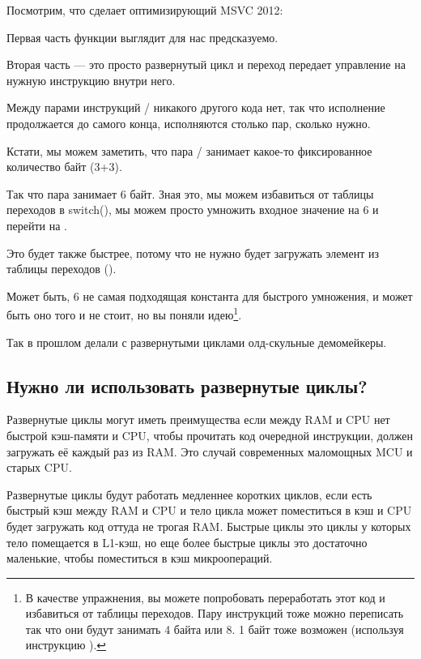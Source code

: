Посмотрим, что сделает оптимизирующий MSVC 2012:



Первая часть функции выглядит для нас предсказуемо.

Вторая часть --- это просто развернутый цикл и переход передает управление на нужную инструкцию
внутри него.

Между парами инструкций / никакого другого кода нет, так что исполнение
продолжается до самого конца, исполняются столько пар, сколько нужно.

Кстати, мы можем заметить, что пара / занимает какое-то фиксированное количество
байт (3+3).

Так что пара занимает 6 байт.
Зная это, мы можем избавиться от таблицы переходов в switch(), мы можем просто умножить входное значение
на 6 и перейти на .

Это будет также быстрее, потому что не нужно будет загружать элемент из таблицы переходов ().

Может быть, 6 не самая подходящая константа для быстрого умножения, и может быть оно того и не стоит,
но вы поняли идею\footnote{В качестве упражнения, вы можете попробовать переработать этот код и избавиться
от таблицы переходов.
Пару инструкций тоже можно переписать так что они будут занимать 4 байта или 8.
1 байт тоже возможен (используя инструкцию ).}.

Так в прошлом делали с развернутыми циклами олд-скульные демомейкеры.

\subsection{Нужно ли использовать развернутые циклы?}

Развернутые циклы могут иметь преимущества если между \ac{RAM} и \ac{CPU} нет быстрой кэш-памяти и \ac{CPU},
чтобы прочитать код очередной
инструкции, должен загружать её каждый раз из \ac{RAM}.
Это случай современных маломощных \ac{MCU} и старых \ac{CPU}.

Развернутые циклы будут работать медленнее коротких циклов, если есть быстрый кэш между \ac{RAM} и \ac{CPU} и тело цикла
может поместиться в кэш и CPU будет загружать код оттуда не трогая \ac{RAM}.
Быстрые циклы это циклы у которых тело помещается в L1-кэш, но еще более быстрые циклы это достаточно маленькие,
чтобы поместиться в кэш микроопераций.

